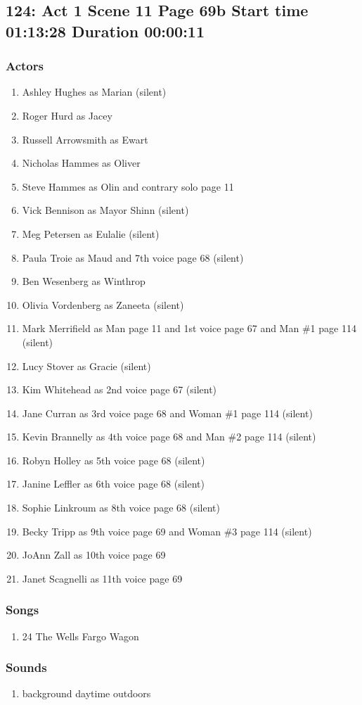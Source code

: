 \subsection{124: Act 1 Scene 11 Page 69b Start time 01:13:28 Duration 00:00:11}

\subsubsection{Actors}
\begin{enumerate}
\item Ashley Hughes as Marian (silent)
\item Roger Hurd as Jacey
\item Russell Arrowsmith as Ewart
\item Nicholas Hammes as Oliver
\item Steve Hammes as Olin and contrary solo page 11
\item Vick Bennison as Mayor Shinn (silent)
\item Meg Petersen as Eulalie (silent)
\item Paula Troie as Maud and 7th voice page 68 (silent)
\item Ben Wesenberg as Winthrop
\item Olivia Vordenberg as Zaneeta (silent)
\item Mark Merrifield as Man page 11 and 1st voice page 67 and Man \#1 page 114 (silent)
\item Lucy Stover as Gracie (silent)
\item Kim Whitehead as 2nd voice page 67 (silent)
\item Jane Curran as 3rd voice page 68 and Woman \#1 page 114 (silent)
\item Kevin Brannelly as 4th voice page 68 and Man \#2 page 114 (silent)
\item Robyn Holley as 5th voice page 68 (silent)
\item Janine Leffler as 6th voice page 68 (silent)
\item Sophie Linkroum as 8th voice page 68 (silent)
\item Becky Tripp as 9th voice page 69 and Woman \#3 page 114 (silent)
\item JoAnn Zall as 10th voice page 69
\item Janet Scagnelli as 11th voice page 69
\end{enumerate}

\subsubsection{Songs}
\begin{enumerate}
\item 24 The Wells Fargo Wagon
\end{enumerate}\subsubsection{Sounds}
\begin{enumerate}
\item background daytime outdoors
\end{enumerate}
